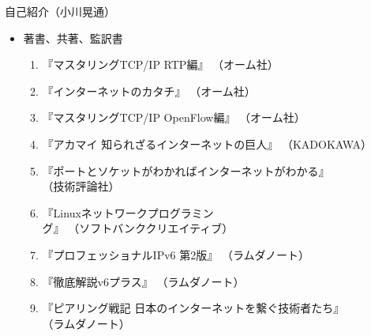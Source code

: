 \documentclass[13pt,dvipdfmx,uplatex]{beamer}
\def\tightlist{\sffamily}
\begin{document}
\begin{frame}{自己紹介（小川晃通）}
\protect\hypertarget{ux81eaux5df1ux7d39ux4ecbux5c0fux5dddux6643ux901a}{}
\begin{itemize}
\tightlist
\item
  著書、共著、監訳書

  \begin{enumerate}
  \tightlist
  \item
    『マスタリングTCP/IP RTP編』{\scriptsize\color{kachi!50} （オーム社）}
  \item
    『インターネットのカタチ』{\scriptsize\color{kachi!50} （オーム社）}
  \item
    『マスタリングTCP/IP OpenFlow編』{\scriptsize\color{kachi!50} （オーム社）}
  \item
    『アカマイ 知られざるインターネットの巨人』{\scriptsize\color{kachi!50} （KADOKAWA）}
  \item
    『ポートとソケットがわかればインターネットがわかる』\\[-.5\baselineskip] {\scriptsize\color{kachi!50} （技術評論社）}
  \item
    『Linuxネットワークプログラミング』{\scriptsize\color{kachi!50} （ソフトバンククリエイティブ）}
  \item
    『プロフェッショナルIPv6 第2版』{\scriptsize\color{kachi!50} （ラムダノート）}
  \item
    『徹底解説v6プラス』{\scriptsize\color{kachi!50} （ラムダノート）}
  \item
    『ピアリング戦記
    日本のインターネットを繋ぐ技術者たち』\\[-.5\baselineskip] {\scriptsize\color{kachi!50} （ラムダノート）}
  \end{enumerate}
\end{itemize}
\end{frame}
\end{document}
